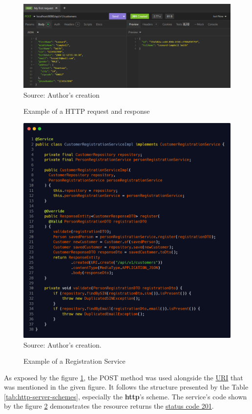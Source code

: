 \begin{figure}[H]
    \caption{Example of a HTTP request and response}
    \centering
    \includegraphics[width=1\linewidth]{figures/http/http_request_response.png}
    \label{fig:http-request}
    \footnotesize Source: Author's creation
\end{figure}

 \begin{figure}[H]
    \centering
    \caption{Example of a Registration Service}
    \includegraphics[width=0.83\linewidth]{figures/http/customer_registration_service_impl.png}
    \label{fig:customer_registration_service_impl}
    \\ \footnotesize Source: Author's creation.
\end{figure}

As exposed by the figure \ref{fig:http-request}, the POST method was used alongside the \hyperref[appendix:glossary]{URI} that was mentioned in the given figure. It follows the structure presented by the Table \ref{tab:http-server-schemes}, especially the \textbf{http}'s scheme. The service's code shown by the figure \ref{fig:customer_registration_service_impl} demonstrates the resource returns the \hyperref[tab:summary_http_status_codes]{status code 201}. 

